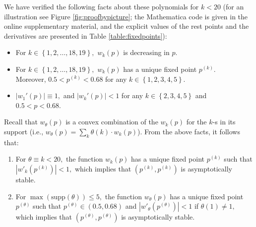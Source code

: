 \documentclass[12pt]{article}
\numberwithin{equation}{section}
\numberwithin{figure}{section}
\theoremstyle{definition}
\theoremstyle{plain}
\theoremstyle{plain}
\theoremstyle{plain}
\theoremstyle{remark}
\theoremstyle{plain}
\theoremstyle{plain}
\begin{document}
We have verified the following facts about these polynomials for $k<20$ (for an illustration see Figure \ref{fig:proofbypicture}; the Mathematica code is given in the online supplementary material, and the explicit values of the rest points and the derivatives are presented in Table \ref{table:fixedpoints}):
\begin{itemize}
    \item For $k \in \left\{1,2,\dots,18,19\right\},$ $w_k(p)$ is decreasing in $p.$
    \item For $k \in \left\{1,2,\dots,18,19\right\},$ $w_k(p)$ has a unique fixed point $p^{(k)}$.\\
    Moreover, $0.5 < p^{(k)} < 0.68$ for any $k \in \left\{1,2,3,4,5\right\}.$ 
    \item $|w_1'(p)| \equiv 1,$ and $|w_k'(p)| < 1$ for any $k \in \left\{2,3,4,5\right\}$ and $0.5<p<0.68.$ 
\end{itemize}

Recall that $w_\theta(p)$ is a convex combination of the $w_k(p)$ for the $k$-s in its support 
(i.e., $w_\theta(p)=\sum_{k}\theta\left(k\right)\cdot w_{k}\left(p\right)$).  From the above facts, it follows that:
\begin{enumerate}
    \item  For $\theta \equiv k < 20,$ the function $w_k(p)$ has a unique fixed point $p^{(k)}$ such that $|w'_k(p^{(k)})| < 1,$ which implies that $(p^{(k)}, p^{(k)})$ is asymptotically stable.
    \item For $\max(\textrm{supp}(\theta)) \leq 5,$ the function $w_{\theta}(p)$ has a unique fixed point $p^{(\theta)}$ such that $p^{(\theta)} \in (0.5,0.68)$ and $|w'_\theta(p^{(\theta)})| < 1$ if $\theta(1) \neq 1,$ 
    which implies that $(p^{(\theta)}, p^{(\theta)})$ is asymptotically stable.
\end{enumerate}
\end{document}
